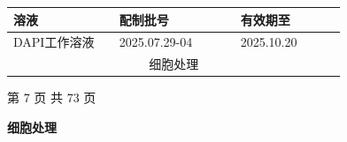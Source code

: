 \documentclass[UTF8,10pt,a4paper,fontset=fandol]{ctexart}
\newcommand{\fieldvalue}[1]{#1}
\newcommand{\handwritten}[1]{#1}
\begin{document}
\begin{tabular}{|p{0.28\linewidth}|p{0.32\linewidth}|p{0.28\linewidth}|}
\hline
溶液 & 配制批号 & 有效期至\\
\hline
DAPI工作溶液 &
\fieldvalue{\handwritten{2025.07.29-04}} &
\fieldvalue{\handwritten{2025.10.20}}\\
\hline
\multicolumn{3}{|c|}{细胞处理}\\
\hline
\end{tabular}

\begin{center}
第 7 页 共 73 页
\end{center}

\newpage

\begin{center}
\textbf{细胞处理}
\end{center}
\end{document}
